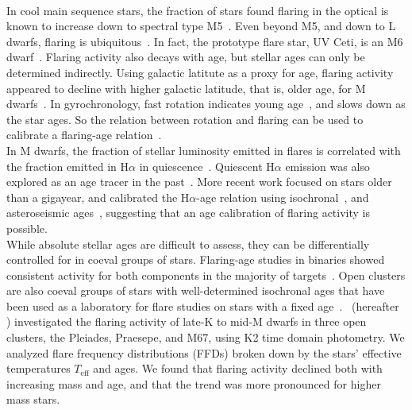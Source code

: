 \documentclass{aa}
\begin{document}
\\
In cool main sequence stars, the fraction of stars found flaring in the optical is known to increase down to spectral type M5~\citep{yang_flaring_2017, chang2020}. Even beyond M5, and down to L dwarfs, flaring is ubiquitous~\citep{stelzer2006, robrade2010, gizis2013, schmidt2015, schmidt2016, paudel2018, paudel2020}. In fact, the prototype flare star, UV Ceti, is an M6 dwarf~\citep{kirkpatrick1991}.  
Flaring activity also decays with age, but stellar ages can only be determined indirectly. Using galactic latitute as a proxy for age, flaring activity appeared to decline with higher galactic latitude, that is, older age, for M dwarfs~\citep{hilton2010, walkowicz2011, howard2019}. In gyrochronology, fast rotation indicates young age~\citep{barnes_rotational_2003}, and slows down as the star ages. So the relation between rotation and flaring can be used to calibrate a flaring-age relation~\citep{davenport2019}. 
\\
In M dwarfs, the fraction of stellar luminosity emitted in flares is correlated with the fraction emitted in H$\alpha$ in quiescence~\citep{yang_flaring_2017}. Quiescent H$\alpha$ emission was also explored as an age tracer in the past~\citep{soderblom_chromospheric_1991, pace_chromospheric_2013, lorenzo-oliveira_age-mass-metallicity-activity_2016}. More recent work focused on stars older than a gigayear, and calibrated the H$\alpha$-age relation using isochronal~\citep{lorenzooliveira2018}, and asteroseismic ages~\citep{booth2017, booth2020}, suggesting that an age calibration of flaring activity is possible.
\\
While absolute stellar ages are difficult to assess, they can be differentially controlled for in coeval groups of stars. Flaring-age studies in binaries showed consistent activity for both components in the majority of targets~\citep{lurie2015, clarke_flare_2018}. Open clusters are also coeval groups of stars with well-determined isochronal ages that have been used as a laboratory for flare studies on stars with a fixed age~\citep{mirzoyan1993, chang2015}. \citet{ilin2019}~(hereafter ) investigated the flaring activity of late-K to mid-M dwarfs in three open clusters, the Pleiades, Praesepe, and M67, using K2 time domain photometry. We analyzed flare frequency distributions (FFDs) broken down by the stars' effective temperatures $T_\mathrm{eff}$ and ages. We found that flaring activity declined both with increasing mass and age, and that the trend was more pronounced for higher mass stars. 
\\
\end{document}
